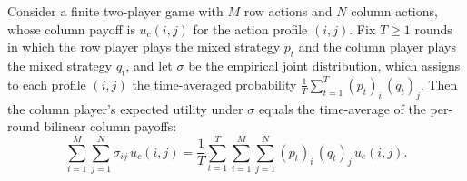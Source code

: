 \begin{lemma}
\label{empiricalJoint_colExpectedUtility}
\leanok
{}
Consider a finite two-player game with $M$ row actions and $N$ column actions, whose
column payoff is $u_c(i,j)$ for the action profile $(i,j)$. Fix $T \ge 1$ rounds in
which the row player plays the mixed strategy $p_t$ and the column player plays the
mixed strategy $q_t$, and let $\sigma$ be the empirical joint distribution, which
assigns to each profile $(i,j)$ the time-averaged probability $\frac{1}{T}\sum_{t=1}^{T}
(p_t)_i\,(q_t)_j$. Then the column player's expected utility under $\sigma$ equals the
time-average of the per-round bilinear column payoffs:
\[
  \sum_{i=1}^{M}\sum_{j=1}^{N} \sigma_{ij}\, u_c(i,j)
  = \frac{1}{T}\sum_{t=1}^{T}\sum_{i=1}^{M}\sum_{j=1}^{N} (p_t)_i\,(q_t)_j\, u_c(i,j).
\]
\end{lemma}

